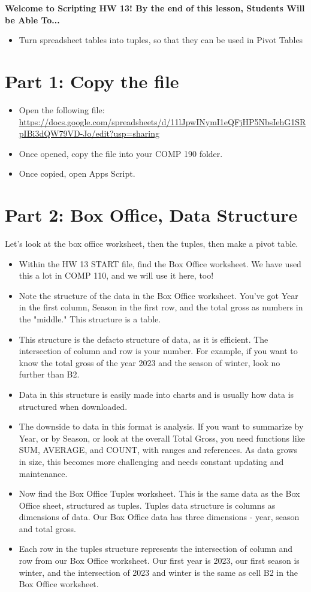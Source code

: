 \documentclass{article}
\newcommand{\AName}{Scripting HW 13}
\begin{document}
\textbf{Welcome to \AName!  By the end of this lesson, Students Will be Able To...}
\begin{itemize}
    \item Turn spreadsheet tables into tuples, so that they can be used in Pivot Tables
\end{itemize}

\section*{Part 1: Copy the file}
\begin{itemize}
    \item Open the following file: \url{https://docs.google.com/spreadsheets/d/11lJpwINymI1eQFjHP5NbsIehG1SRpIBi3dQW79VD-Jo/edit?usp=sharing}
    \item Once opened, copy the file into your COMP 190 folder. 
    \item Once copied, open Apps Script.
\end{itemize}

\section*{Part 2: Box Office, Data Structure}
Let's look at the box office worksheet, then the tuples, then make a pivot table.
\begin{itemize}
    \item Within the HW 13 START file, find the Box Office worksheet.  We have used this a lot in COMP 110, and we will use it here, too!
    \item Note the structure of the data in the Box Office worksheet.  You've got Year in the first column, Season in the first row, and the total gross as numbers in the "middle."  This structure is a table.
    \item This structure is the defacto structure of data, as it is efficient.  The intersection of column and row is your number.  For example, if you want to know the total gross of the year 2023 and the season of winter, look no further than B2.
    \item Data in this structure is easily made into charts and is usually how data is structured when downloaded.
    \item The downside to data in this format is analysis.  If you want to summarize by Year, or by Season, or look at the overall Total Gross, you need functions like SUM, AVERAGE, and COUNT, with ranges and references.  As data grows in size, this becomes more challenging and needs constant updating and maintenance.
    \item Now find the Box Office Tuples worksheet.  This is the same data as the Box Office sheet, structured as tuples. Tuples data structure is columns as dimensions of data.  Our Box Office data has three dimensions - year, season and total gross.
    \item Each row in the tuples structure represents the intersection of column and row from our Box Office worksheet.  Our first year is 2023, our first season is winter, and the intersection of 2023 and winter is the same as cell B2 in the Box Office worksheet.
\end{itemize}
\end{document}
